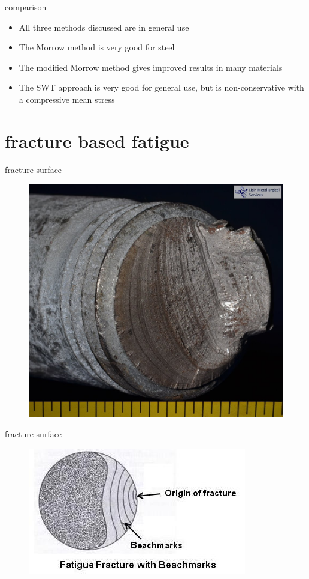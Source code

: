 \documentclass[10pt]{beamer}
\begin{document}
\begin{frame}{comparison}
	\begin{itemize}[<+->]
		\item All three methods discussed are in general use
		\item The Morrow method is very good for steel
		\item The modified Morrow method gives improved results in many materials
		\item The SWT approach is very good for general use, but is non-conservative with a compressive mean stress
	\end{itemize}
\end{frame}

\section{fracture based fatigue}

\begin{frame}{fracture surface}
	\begin{figure}
		\centering
		\includegraphics[width=0.7\linewidth]{../Figures/fracture_surface}
		\label{fig:fracture_surface}
	\end{figure}
\end{frame}

\begin{frame}{fracture surface}	
	\begin{figure}
		\centering
		\includegraphics[width=0.7\linewidth]{../Figures/Fatigue-Fracture-with-Beachmarks}
		\label{fig:Fatigue-Fracture-with-Beachmarks}
	\end{figure}
\end{frame}
\end{document}
